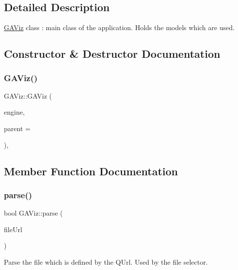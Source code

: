 \subsection{Detailed Description}
\hyperlink{class_g_a_viz}{G\+A\+Viz} class \+: main class of the application. Holds the models which are used. 

\subsection{Constructor \& Destructor Documentation}
\mbox{\label{class_g_a_viz_a25d7842507cad8f54ae2ff2b5104efff}} 
\subsubsection{\texorpdfstring{G\+A\+Viz()}{GAViz()}}
{\footnotesize\ttfamily G\+A\+Viz\+::\+G\+A\+Viz (\begin{DoxyParamCaption}\item[{Q\+Qml\+Application\+Engine $\ast$}]{engine,  }\item[{Q\+Object $\ast$}]{parent = {} }\end{DoxyParamCaption})\hspace{0.3cm}{\ttfamily [inline]}, {\ttfamily [explicit]}}



\subsection{Member Function Documentation}
\mbox{\label{class_g_a_viz_aa8c0e575e4948bb03627275b5049ddc9}} 
\subsubsection{\texorpdfstring{parse()}{parse()}}
{\footnotesize\ttfamily bool G\+A\+Viz\+::parse (\begin{DoxyParamCaption}\item[{Q\+Url}]{file\+Url }\end{DoxyParamCaption})}



Parse the file which is defined by the Q\+Url. Used by the file selector. 



